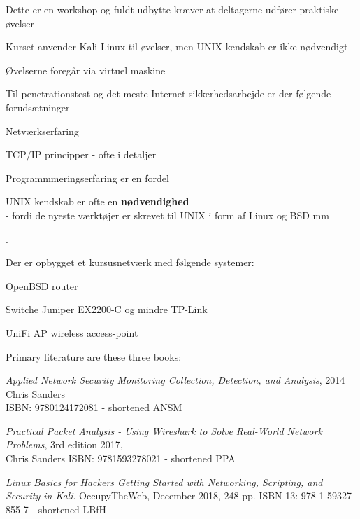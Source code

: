 \documentclass[Screen16to9,17pt]{foils}
\begin{document}

\begin{list1}
\item Dette er en workshop og fuldt udbytte kræver at
  deltagerne udfører praktiske øvelser
\item Kurset anvender Kali Linux til øvelser, men UNIX kendskab
er ikke nødvendigt
\item Øvelserne foregår via virtuel maskine
\begin{list2}
\item Til penetrationstest og det meste Internet-sikkerhedsarbejde er der
følgende forudsætninger
\item Netværkserfaring
\item TCP/IP principper - ofte i detaljer
\item Programmmeringserfaring er en fordel
\item UNIX kendskab er ofte en {\bfseries nødvendighed}\\
- fordi de nyeste værktøjer er skrevet til UNIX i form af Linux og BSD
 mm
\end{list2}
\end{list1}

.

\begin{list1}
\item Der er opbygget et kursusnetværk med følgende systemer:
\begin{list2}
\item OpenBSD router
\item Switche Juniper EX2200-C og mindre TP-Link
\item UniFi AP wireless access-point
\end{list2}
\end{list1}


Primary literature are these three books:
\begin{list2}
\item \emph{Applied Network Security Monitoring Collection, Detection, and Analysis}, 2014 Chris Sanders \\
ISBN: 9780124172081 - shortened ANSM
\item \emph{Practical Packet Analysis - Using Wireshark to Solve Real-World Network Problems}, 3rd edition 2017, \\
Chris Sanders ISBN: 9781593278021 - shortened PPA
\item \emph{Linux Basics for Hackers Getting Started with Networking, Scripting, and Security in Kali}. OccupyTheWeb, December 2018, 248 pp. ISBN-13: 978-1-59327-855-7 - shortened LBfH
\end{list2}
\end{document}
